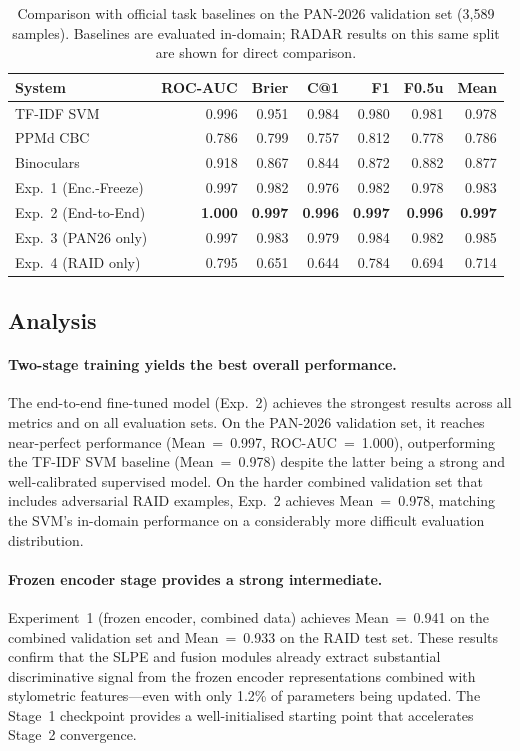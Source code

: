 \begin{table}[t]
\caption{Comparison with official task baselines on the PAN-2026 validation set
  (3,589 samples). Baselines are evaluated in-domain; RADAR results on this
  same split are shown for direct comparison.}
\label{tab:pan26_results}
\begin{tabular}{lrrrrrr}
\toprule
\textbf{System} & \textbf{ROC-AUC} & \textbf{Brier} & \textbf{C@1} & \textbf{F1} & \textbf{F0.5u} & \textbf{Mean} \\
\midrule
TF-IDF SVM          & 0.996 & 0.951 & 0.984 & 0.980 & 0.981 & 0.978 \\
PPMd CBC            & 0.786 & 0.799 & 0.757 & 0.812 & 0.778 & 0.786 \\
Binoculars          & 0.918 & 0.867 & 0.844 & 0.872 & 0.882 & 0.877 \\
\midrule
Exp.~1 (Enc.-Freeze) & 0.997 & 0.982 & 0.976 & 0.982 & 0.978 & 0.983 \\
Exp.~2 (End-to-End)  & \textbf{1.000} & \textbf{0.997} & \textbf{0.996} & \textbf{0.997} & \textbf{0.996} & \textbf{0.997} \\
Exp.~3 (PAN26 only)  & 0.997 & 0.983 & 0.979 & 0.984 & 0.982 & 0.985 \\
Exp.~4 (RAID only)   & 0.795 & 0.651 & 0.644 & 0.784 & 0.694 & 0.714 \\
\bottomrule
\end{tabular}
\end{table}

\subsection{Analysis}

\paragraph{Two-stage training yields the best overall performance.}
The end-to-end fine-tuned model (Exp.~2) achieves the strongest results across all metrics
and on all evaluation sets. On the PAN-2026 validation set, it reaches near-perfect performance
(Mean~=~0.997, ROC-AUC~=~1.000), outperforming the TF-IDF SVM baseline
(Mean~=~0.978) despite the latter being a strong and well-calibrated supervised model.
On the harder combined validation set that includes adversarial RAID examples, Exp.~2
achieves Mean~=~0.978, matching the SVM's in-domain performance on a considerably more
difficult evaluation distribution.

\paragraph{Frozen encoder stage provides a strong intermediate.}
Experiment~1 (frozen encoder, combined data) achieves Mean~=~0.941 on the combined validation
set and Mean~=~0.933 on the RAID test set. These results confirm that the SLPE and fusion
modules already extract substantial discriminative signal from the frozen encoder
representations combined with stylometric features—even with only 1.2\% of parameters
being updated. The Stage~1 checkpoint provides a well-initialised starting point that
accelerates Stage~2 convergence.

